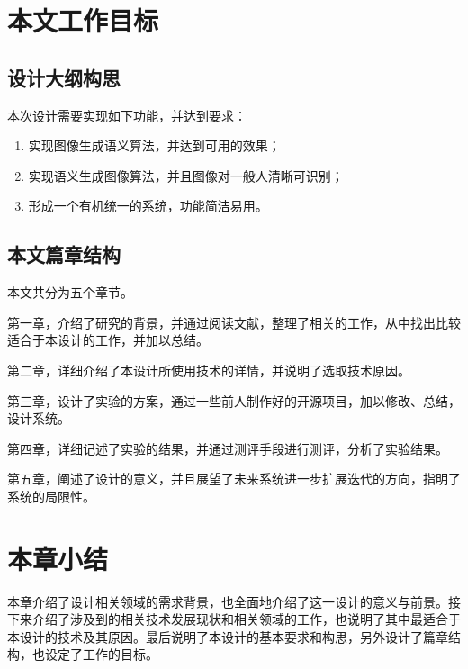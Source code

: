 \section{本文工作目标}

\subsection{设计大纲构思}
本次设计需要实现如下功能，并达到要求：
\begin{enumerate}[fullwidth,itemindent=2em,label=\arabic*.]
    \item 实现图像生成语义算法，并达到可用的效果；
    \item 实现语义生成图像算法，并且图像对一般人清晰可识别；
    \item 形成一个有机统一的系统，功能简洁易用。
\end{enumerate}

\subsection{本文篇章结构}

本文共分为五个章节。

第一章，介绍了研究的背景，并通过阅读文献，整理了相关的工作，从中找出比较适合于本设计的工作，并加以总结。

第二章，详细介绍了本设计所使用技术的详情，并说明了选取技术原因。

第三章，设计了实验的方案，通过一些前人制作好的开源项目，加以修改、总结，设计系统。

第四章，详细记述了实验的结果，并通过测评手段进行测评，分析了实验结果。

第五章，阐述了设计的意义，并且展望了未来系统进一步扩展迭代的方向，指明了系统的局限性。

\section{本章小结}
本章介绍了设计相关领域的需求背景，也全面地介绍了这一设计的意义与前景。接下来介绍了涉及到的相关技术发展现状和相关领域的工作，也说明了其中最适合于本设计的技术及其原因。最后说明了本设计的基本要求和构思，另外设计了篇章结构，也设定了工作的目标。